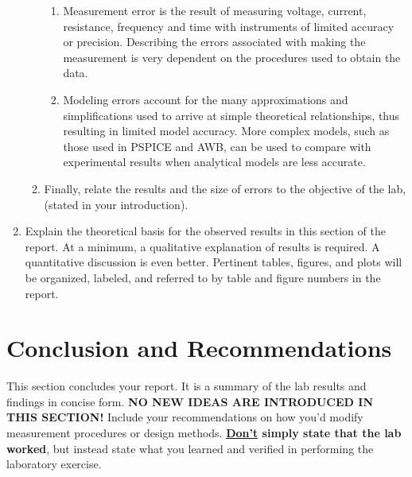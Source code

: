 \begin{enumerate}
\begin{enumerate}
\begin{enumerate}
			\item Measurement error is the result of measuring voltage, current, resistance, frequency and time with instruments of limited accuracy or precision.  Describing the errors associated with making the measurement is very dependent on the procedures used to obtain the data.
			\item Modeling errors account for the many approximations and simplifications used to arrive at simple theoretical relationships, thus resulting in limited model accuracy.  More complex models, such as those used in PSPICE\textsuperscript{\textregistered} and AWB\textsuperscript{\textregistered}, can be used to compare with experimental results when analytical models are less accurate.
		\end{enumerate}
		\item Finally, relate the results and the size of errors to the objective of the lab, (stated in your introduction).
	\end{enumerate}
	\item Explain the theoretical basis for the observed results in this section of the report.  At a minimum, a qualitative explanation of results is required.  A quantitative discussion is even better.  Pertinent tables, figures, and plots will be organized, labeled, and referred to by table and figure numbers in the report.
\end{enumerate}


\section{Conclusion and Recommendations}
This section concludes your report.  It is a summary of the lab results and findings in concise form.  \textbf{NO NEW IDEAS ARE INTRODUCED IN THIS SECTION!}  Include your recommendations on how you’d modify measurement procedures or design methods.  \textbf{\underline{Don’t} simply state that the lab worked}, but instead state what you learned and verified in performing the laboratory exercise.